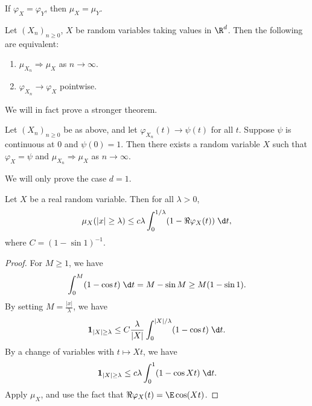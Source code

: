 \documentclass[a4paper]{article}
\begin{document}
\begin{prop}
  If $\varphi_X = \varphi_Y$, then $\mu_X = \mu_Y$.
\end{prop}

\begin{thm}
  Let $(X_n)_{n \geq 0}$, $X$ be random variables taking values in $\R^d$. Then the following are equivalent:
  \begin{enumerate}
    \item $\mu_{X_n} \Rightarrow \mu_X$ as $n \to \infty$.
    \item $\varphi_{X_n} \to \varphi_X$ pointwise.
  \end{enumerate}
\end{thm}
We will in fact prove a stronger theorem.
\begin{thm}[L\'evy]
  Let $(X_n)_{n \geq 0}$ be as above, and let $\varphi_{X_n}(t) \to \psi(t)$ for all $t$. Suppose $\psi$ is continuous at $0$ and $\psi(0) = 1$. Then there exists a random variable $X$ such that $\varphi_X = \psi$ and $\mu_{X_n} \Rightarrow \mu_X$ as $n \to \infty$.
\end{thm}
We will only prove the case $d= 1$.
\begin{lemma}
  Let $X$ be a real random variable. Then for all $\lambda > 0$,
  \[
    \mu_X( |x| \geq \lambda) \leq c \lambda \int_0^{1/\lambda} (1 - \Re \varphi_X(t)) \;\d t,
  \]
  where $C = (1 - \sin 1)^{-1}$.
\end{lemma}

\begin{proof}
  For $M \geq 1$, we have
  \[
    \int_0^M (1 - \cos t)\;\d t = M - \sin M \geq M(1 - \sin 1).
  \]
  By setting $M = \frac{|x|}{\lambda}$, we have
  \[
    \mathbf{1}_{|X| \geq \lambda} \leq C \frac{\lambda}{|X|} \int_0^{|X|/\lambda} (1 - \cos t)\;\d t.
  \]
  By a change of variables with $t \mapsto Xt$, we have
  \[
    \mathbf{1}_{|X| \geq \lambda} \leq c\lambda \int_0^1 (1 - \cos Xt)\;\d t.
  \]
  Apply $\mu_X$, and use the fact that $\Re \varphi_X(t) = \E \cos (Xt)$.
\end{proof}
\end{document}

